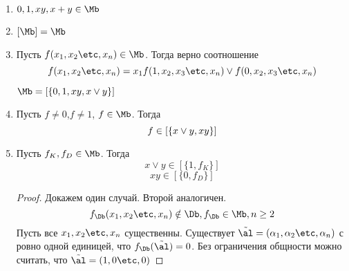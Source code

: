\documentclass[unicode, 10pt, a4paper, oneside, fleqn]{article}
\begin{document}
    \begin{enumerate}
      \item $0, 1, xy, x+y \in \Mb$
      \item $ [\Mb] = \Mb $
      \item  
          \begin{stm} 
            Пусть $f(\set[x]{n}) \in \Mb$. Тогда верно соотношение 
            \begin{displaymath}
              f(\set[x]{n}) = x_1f(1, \setf[x]{n})\vee f(0, \setf[x]{n})
            \end{displaymath}
          \end{stm}
          \begin{imp}
            \begin{math}
              \Mb =\cls{0, 1, xy, x\vee y}
            \end{math}
          \end{imp}
        \item 
          \begin{stm}
            Пусть $f \neq 0$,$f \neq 1$, $f \in \Mb$. Тогда 
            \begin{displaymath}
              f \in [\{x\vee{y}, xy\}]
            \end{displaymath}
          \end{stm}
        \item 
          \begin{stm}
            Пусть $f_K, f_D \in \Mb$. Тогда
            \begin{displaymath}
              x\vee y \in [\{1, f_K\}]  
            \end{displaymath}
            \begin{displaymath}
              xy \in [\{0, f_D\}]
            \end{displaymath}
          \end{stm}
          \begin{proof}
            Докажем один случай. Второй аналогичен.
            \begin{displaymath} 
              f_{\Db}(\set[x]{n}) \notin \Db, f_{\Db} \in \Mb, n \ge 2
            \end{displaymath}
            Пусть все $\set[x]{n}$ существенны. Существует $\tilde \al= (\set{n})$ 
            с ровно одной единицей, что  $f_{\Db}(\tilde \al) = 0$. \WHY 
            Без ограничения общности можно считать, что 
            \begin{math}
              \alt = (1, 0 \etc, 0)
            \end{math}

\end{proof}
\end{enumerate}
\end{document}
